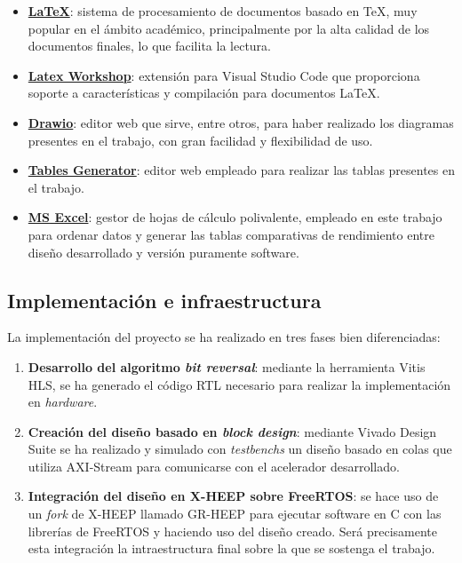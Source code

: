 \begin{itemize}
    \item \textbf{\href{https://www.latex-project.org/get/}{\LaTeX}}: sistema de procesamiento de documentos basado en TeX, muy popular en el ámbito académico, principalmente por la alta calidad de los documentos finales, lo que facilita la lectura.
    \item \textbf{\href{https://marketplace.visualstudio.com/items?itemName=James-Yu.latex-workshop}{Latex Workshop}}: extensión para Visual Studio Code que proporciona soporte a características y compilación para documentos \LaTeX.
    \item \textbf{\href{https://www.drawio.com/}{Drawio}}: editor web que sirve, entre otros, para haber realizado los diagramas presentes en el trabajo, con gran facilidad y flexibilidad de uso.
    \item \textbf{\href{https://www.tablesgenerator.com/}{Tables Generator}}: editor web empleado para realizar las tablas presentes en el trabajo.
    \item \textbf{\href{https://www.microsoft.com/es-es/microsoft-365/excel}{\ac{MS} Excel}}: gestor de hojas de cálculo polivalente, empleado en este trabajo para ordenar datos y generar las tablas comparativas de rendimiento entre diseño desarrollado y versión puramente software.
\end{itemize}

\subsection{Implementación e infraestructura}
La implementación del proyecto se ha realizado en tres fases bien diferenciadas:

\begin{enumerate}
    \item \textbf{Desarrollo del algoritmo \textit{bit reversal}}: mediante la herramienta Vitis HLS, se ha generado el código RTL necesario para realizar la implementación en \textit{hardware}.
    \item \textbf{Creación del diseño basado en \emph{block design}}: mediante Vivado Design Suite se ha realizado y simulado con \textit{testbenchs} un diseño basado en colas que utiliza AXI-Stream para comunicarse con el acelerador desarrollado.
    \item \textbf{Integración del diseño en X-HEEP sobre FreeRTOS}: se hace uso de un \textit{fork} de X-HEEP llamado GR-HEEP \cite{grheepInfo} para ejecutar software en C con las librerías de FreeRTOS y haciendo uso del diseño creado. Será precisamente esta integración la intraestructura final sobre la que se sostenga el trabajo.
\end{enumerate}
